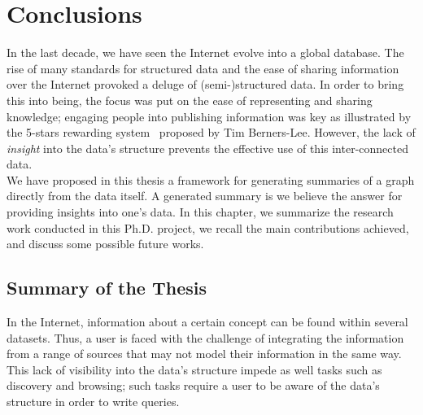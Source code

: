 \chapter{Conclusions}

In the last decade, we have seen the Internet evolve into a global database. The rise of many standards for structured data and the ease of sharing information over the Internet provoked a deluge of (semi-)structured data. In order to bring this into being, the focus was put on the ease of representing and sharing knowledge; engaging people into publishing information was key as illustrated by the 5-stars rewarding system~\cite{5stars} proposed by Tim Berners-Lee. However, the lack of \emph{insight} into the data's structure prevents the effective use of this inter-connected data.\\

We have proposed in this thesis a framework for generating summaries of a graph directly from the data itself. A generated summary is we believe the answer for providing insights into one's data. In this chapter, we summarize the research work conducted in this Ph.D. project, we recall the main contributions achieved, and discuss some possible future works.

\section{Summary of the Thesis}


In the Internet, information about a certain concept can be found within several datasets. Thus, a user is faced with the challenge of integrating the information from a range of sources that may not model their information in the same way. This lack of visibility into the data's structure impede as well tasks such as discovery and browsing; such tasks require a user to be aware of the data's structure in order to write queries.

